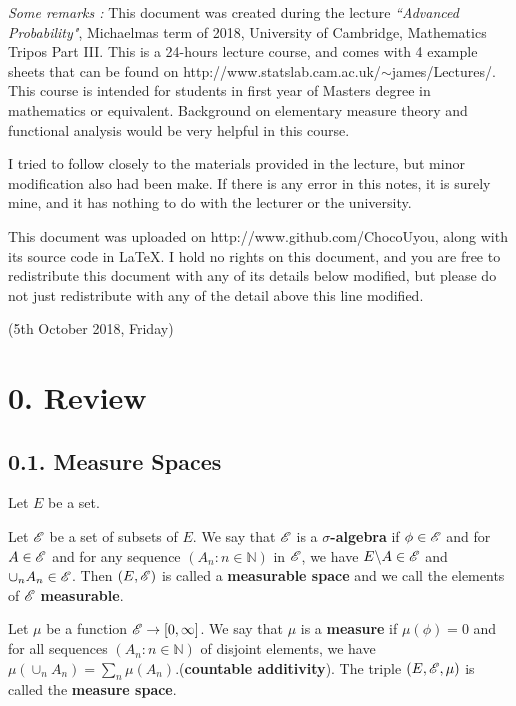 \documentclass[12pt,a4paper]{report}
\begin{document}
\begin{changemargin}{1.5cm}{1.5cm}
\textit{Some remarks :} This document was created during the lecture \textit{``Advanced Probability"}, Michaelmas term of 2018, University of Cambridge, Mathematics Tripos Part III. This is a 24-hours lecture course, and comes with 4 example sheets that can be found on http://www.statslab.cam.ac.uk/$\sim$james/Lectures/. This course is intended for students in first year of Masters degree in mathematics or equivalent. Background on elementary measure theory and functional analysis would be very helpful in this course.
\s

I tried to follow closely to the materials provided in the lecture, but minor modification also had been make. If there is any error in this notes, it is surely mine, and it has nothing to do with the lecturer or the university.
\s

This document was uploaded on http://www.github.com/ChocoUyou, along with its source code in \LaTeX. I hold no rights on this document, and you are free to redistribute this document with any of its details below modified, but please do not just redistribute with any of the detail above this line modified.
\end{changemargin}

\newpage

\newday

(5th October 2018, Friday)

\section*{0. Review}

\subsection*{0.1. Measure Spaces}

Let $E$ be a set.
\s

Let $\mathscr{E}$ be a set of subsets of $E$. We say that $\mathscr{E}$ is a \textbf{$\sigma$-algebra} if $\phi \in \mathscr{E}$ and for $A \in \mathscr{E}$ and for any sequence $(A_n : n\in \mathbb{N})$ in $\mathscr{E}$, we have $E\backslash A \in \mathscr{E}$ and $\cup_n A_n \in \mathscr{E}$. Then $(E,\mathscr{E})$ is called a \textbf{measurable space} and we call the elements of $\mathscr{E}$ \textbf{measurable}.
\s

Let $\mu$ be a function $\mathscr{E} \rightarrow [0,\infty]$. We say that $\mu$ is a \textbf{measure} if $\mu(\phi)=0$ and for all sequences $(A_n : n\in \mathbb{N})$ of disjoint elements, we have $\mu(\cup_n A_n) = \sum_n \mu(A_n)$.(\textbf{countable additivity}). The triple $(E,\mathscr{E}, \mu)$ is called the \textbf{measure space}. 
\s
\end{document}
